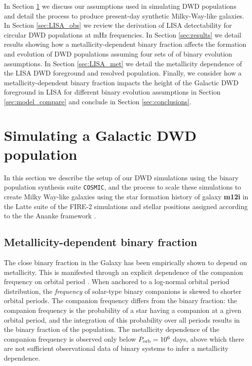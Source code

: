 \documentclass[twocolumn]{aastex631}
\newcommand{\cosmic}{\texttt{COSMIC}}
\begin{document}
In Section \ref{sec:simulations} we discuss our assumptions used in simulating DWD populations and detail the process to produce present-day synthetic Milky-Way-like galaxies. In Section \ref{sec:LISA_obs} we review the derivation of LISA detectability for circular DWD populations at mHz frequencies. In Section \ref{sec:results} we detail results showing how a metallicity-dependent binary fraction affects the formation and evolution of DWD populations assuming four sets of of binary evolution assumptions. In Section \ref{sec:LISA_met} we detail the metallicity dependence of the LISA DWD foreground and resolved population. Finally, we consider how a metallicity-dependent binary fraction impacts the height of the Galactic DWD foreground in LISA for different binary evolution assumptions in Section \ref{sec:model_compare} and conclude in Section \ref{sec:conclusions}.  

\section{Simulating a Galactic DWD population}\label{sec:simulations}
In this section we describe the setup of our DWD simulations using the binary population synthesis suite \cosmic, and the process to scale these simulations to create Milky Way-like galaxies using the star formation history of galaxy \textbf{m12i} in the Latte suite of the FIRE-2 simulations \citep{Wetzel2016, Hopkins2018} and stellar positions assigned according to the the Ananke framework \citep{Sanderson2020}. 

\subsection{Metallicity-dependent binary fraction}\label{subsec:metbinfrac}
The close binary fraction in the Galaxy has been empirically shown to depend on metallicity. This is manifested through an explicit dependence of the companion frequency on orbital period \citep{Moe2021}. When anchored to a log-normal orbital period distribution, the \emph{frequency} of solar-type binary companions is skewed to shorter orbital periods. The companion frequency differs from the binary fraction: the companion frequency is the probability of a star having a companion at a given orbital period, and the integration of this probability over all periods results in the binary fraction of the population. The metallicity dependence of the companion frequency is observed only below $P_{\rm{orb}}=10^6$ days, above which there are not sufficient observational data of binary systems to infer a metallicity dependence.
\end{document}

